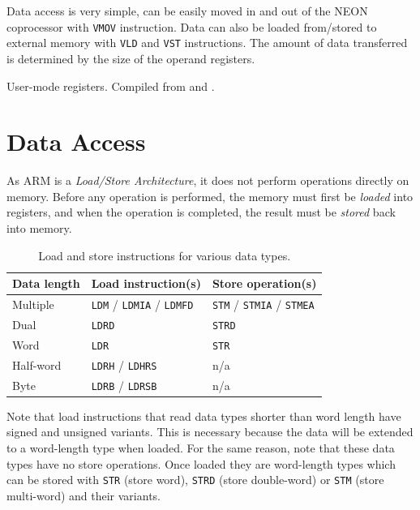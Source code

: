 \documentclass[oneside,a4paper]{report}
\begin{document}
Data access is very simple, can be easily moved in and out of the NEON coprocessor with \texttt{VMOV} instruction. Data can also be loaded from/stored to external memory with \texttt{VLD\*} and \texttt{VST\*} instructions. The amount of data transferred is determined by the size of the operand registers.

\begin{table}[htbp]
	\centering
	
	\caption{User-mode registers. Compiled from \cite[p. 15]{AAPCS} and \cite[p. 14--15]{iOSABI}.}
	\label{tab:registers}
\end{table}

\section{Data Access}\label{sec:dataaccess}

As ARM is a \emph{Load/Store Architecture}, it does not perform operations directly on memory. Before any operation is performed, the memory must first be \emph{loaded} into registers, and when the operation is completed, the result must be \emph{stored} back into memory.

\begin{table}[htb]
	\begin{tabular}{lll}
		\toprule
		Data length	&	Load instruction(s)								&	Store operation(s)								\\
		\midrule
		Multiple	&	\texttt{LDM} / \texttt{LDMIA} / \texttt{LDMFD}	&	\texttt{STM} / \texttt{STMIA} / \texttt{STMEA}	\\
		Dual		&	\texttt{LDRD}									&	\texttt{STRD}									\\
		Word		&	\texttt{LDR}									&	\texttt{STR}									\\
		Half-word   &	\texttt{LDRH} / \texttt{LDHRS}					&	n/a												\\
		Byte        &	\texttt{LDRB} / \texttt{LDRSB}					&	n/a												\\
		\bottomrule		
	\end{tabular}
	\caption{Load and store instructions for various data types.}
	\label{tab:loadstore}
\end{table}

Note that load instructions that read data types shorter than word length have signed and unsigned variants. This is necessary because the data will be extended to a word-length type when loaded. For the same reason, note that these data types have no store operations. Once loaded they are word-length types which can be stored with \texttt{STR} (store word), \texttt{STRD} (store double-word) or \texttt{STM} (store multi-word) and their variants.
\end{document}
